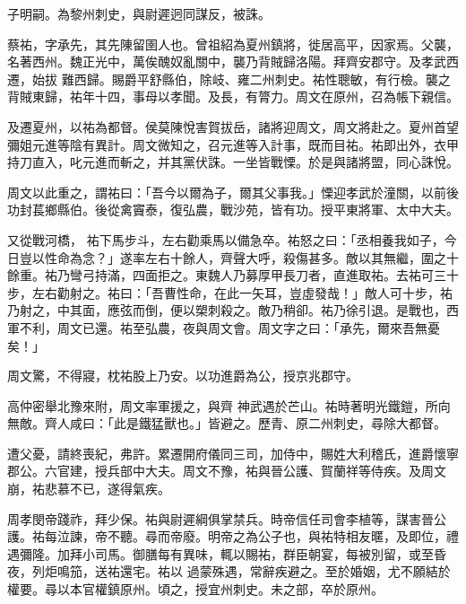 \begin{pinyinscope}
 子明嗣。為黎州刺史，與尉遲迥同謀反，被誅。



 蔡祐，字承先，其先陳留圉人也。曾祖紹為夏州鎮將，徙居高平，因家焉。父襲，名著西州。魏正光中，萬俟醜奴亂關中，襲乃背賊歸洛陽。拜齊安郡守。及孝武西遷，始拔
 難西歸。賜爵平舒縣伯，除岐、雍二州刺史。祐性聰敏，有行檢。襲之背賊東歸，祐年十四，事母以孝聞。及長，有膂力。周文在原州，召為帳下親信。



 及遷夏州，以祐為都督。侯莫陳悅害賀拔岳，諸將迎周文，周文將赴之。夏州首望彌姐元進等陰有異計。周文微知之，召元進等入計事，既而目祐。祐即出外，衣甲持刀直入，叱元進而斬之，并其黨伏誅。一坐皆戰慄。於是與諸將盟，同心誅悅。



 周文以此重之，謂祐曰：「吾今以爾為子，爾其父事我。」慄迎孝武於潼關，以前後功封萇鄉縣伯。後從禽竇泰，復弘農，戰沙苑，皆有功。授平東將軍、太中大夫。



 又從戰河橋，
 祐下馬步斗，左右勸乘馬以備急卒。祐怒之曰：「丞相養我如子，今日豈以性命為念？」遂率左右十餘人，齊聲大呼，殺傷甚多。敵以其無繼，圍之十餘重。祐乃彎弓持滿，四面拒之。東魏人乃募厚甲長刀者，直進取祐。去祐可三十步，左右勸射之。祐曰：「吾曹性命，在此一矢耳，豈虛發哉！」敵人可十步，祐乃射之，中其面，應弦而倒，便以槊刺殺之。敵乃稍卻。祐乃徐引退。是戰也，西軍不利，周文已還。祐至弘農，夜與周文會。周文字之曰：「承先，爾來吾無憂矣！」



 周文驚，不得寢，枕祐股上乃安。以功進爵為公，授京兆郡守。



 高仲密舉北豫來附，周文率軍援之，與齊
 神武遇於芒山。祐時著明光鐵鎧，所向無敵。齊人咸曰：「此是鐵猛獸也。」皆避之。歷青、原二州刺史，尋除大都督。



 遭父憂，請終喪紀，弗許。累遷開府儀同三司，加侍中，賜姓大利稽氏，進爵懷寧郡公。六官建，授兵部中大夫。周文不豫，祐與晉公護、賀蘭祥等侍疾。及周文崩，祐悲慕不已，遂得氣疾。



 周孝閔帝踐祚，拜少保。祐與尉遲綱俱掌禁兵。時帝信任司會李植等，謀害晉公護。祐每泣諫，帝不聽。尋而帝廢。明帝之為公子也，與祐特相友暱，及即位，禮遇彌隆。加拜小司馬。御膳每有異味，輒以賜祐，群臣朝宴，每被別留，或至昏夜，列炬鳴笳，送祐還宅。祐以
 過蒙殊遇，常辭疾避之。至於婚姻，尤不願結於權要。尋以本官權鎮原州。頃之，授宜州刺史。未之部，卒於原州。




\end{pinyinscope}
